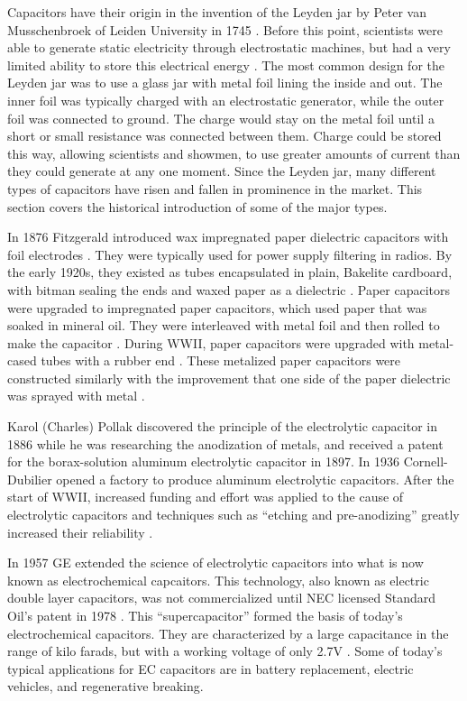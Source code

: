 Capacitors have their origin in the invention of the Leyden jar by Peter van Musschenbroek of Leiden University in 1745 \cite{empLight}. Before this point, scientists were able to generate static electricity through electrostatic machines, but had a very limited ability to store this electrical energy \cite{ieee_hist}.
The most common design for the Leyden jar was to use a glass jar with metal foil lining the inside and out. The inner foil was typically charged with an electrostatic generator, while the outer foil was connected to ground. The charge would stay on the metal foil until a short or small resistance was connected between them. Charge could be stored this way, allowing scientists and showmen, to use greater amounts of current than they could generate at any one moment.
Since the Leyden jar, many different types of capacitors have risen and fallen in prominence in the market. This section covers the historical introduction of some of the major types.

In 1876 Fitzgerald introduced wax impregnated paper dielectric capacitors with foil electrodes \cite[ch.~11]{dumInv}\cite{learn_caps}. They were typically used for power supply filtering in radios. By the early 1920s, they existed as tubes encapsulated in plain, Bakelite cardboard, with bitman sealing the ends and waxed paper as a dielectric \cite[ch~3]{dumInv}.
Paper capacitors were upgraded to impregnated paper capacitors, which used paper that was soaked in mineral oil. They were interleaved with metal foil and then rolled to make the capacitor \cite[ch.~8.2.1.1]{poorIntro}. During WWII, paper capacitors were upgraded with metal-cased tubes with a rubber end \cite[ch.~8.1]{poorIntro}. These metalized paper capacitors were constructed similarly with the improvement that one side of the paper dielectric was sprayed with metal \cite{hist_cerFilt}.

Karol (Charles) Pollak discovered the principle of the electrolytic capacitor in 1886 while he was researching the anodization of metals, and received a patent for the borax-solution aluminum electrolytic capacitor in 1897.
In 1936 Cornell-Dubilier opened a factory to produce aluminum electrolytic capacitors.
After the start of WWII, increased funding and effort was applied to the cause of electrolytic capacitors and techniques such as ``etching and pre-anodizing'' greatly increased their reliability \cite{deis_hist}\cite{wiki_elec}.

In 1957 GE extended the science of electrolytic capacitors into what is now known as electrochemical capcaitors. This technology, also known as electric double layer capacitors, was not commercialized until NEC licensed Standard Oil's patent in 1978 \cite{electrochem_intro}. This ``supercapacitor'' formed the basis of today's electrochemical capacitors. They are characterized by a large capacitance in the range of kilo farads, but with a working voltage of only 2.7V \cite{electrochem_intro}. Some of today's typical applications for EC capacitors are in battery replacement, electric vehicles, and regenerative breaking.

